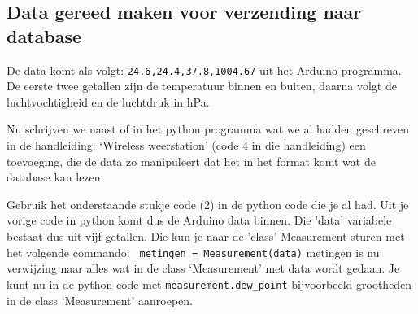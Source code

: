 \subsection{Data gereed maken voor verzending naar database}

De data komt als volgt: \verb|24.6,24.4,37.8,1004.67| uit het Arduino programma.
De eerste twee getallen zijn de temperatuur binnen en buiten, daarna volgt de
luchtvochtigheid en de luchtdruk in hPa.

Nu schrijven we naast of in het python programma wat we al hadden geschreven in de
handleiding: `Wireless weerstation' (code 4 in die handleiding) een toevoeging, die de data
zo manipuleert dat het in het format komt wat de \hisparc database kan lezen.

Gebruik het onderstaande stukje code (2) in de python code die je al had.
Uit je vorige code in python komt dus de Arduino data binnen. Die 'data' variabele
bestaat dus uit vijf getallen. Die kun je naar de 'class' Measurement sturen met
het volgende commando:  \verb| metingen = Measurement(data)|
metingen is nu verwijzing naar alles wat in de class `Measurement' met data wordt
gedaan.  Je kunt nu in de python code met \verb|measurement.dew_point| bijvoorbeeld
grootheden in de class `Measurement' aanroepen.

